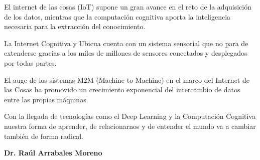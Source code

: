\documentclass[a4paper,12pt]{article}
\begin{document}
\par
El internet de las cosas (IoT) supone un gran avance en el reto de la adquisición de los datos, mientras que la computación cognitiva aporta la inteligencia necesaria para la extracción del conocimiento.
\par
La Internet Cognitiva y Ubicua cuenta con un sistema sensorial que no para de extenderse gracias a los miles de millones de sensores conectados y desplegados por todas partes.
\par
El auge de los sistemas M2M (Machine to Machine) en el marco del Internet de las Cosas ha promovido un crecimiento exponencial del intercambio de datos entre las propias máquinas.
\par
Con la llegada de tecnologías como el Deep Learning y la Computación Cognitiva nuestra forma de aprender, de relacionarnos y de entender el mundo va a cambiar también de forma radical.
\par
\textbf{Dr. Raúl Arrabales Moreno}
\end{document}
